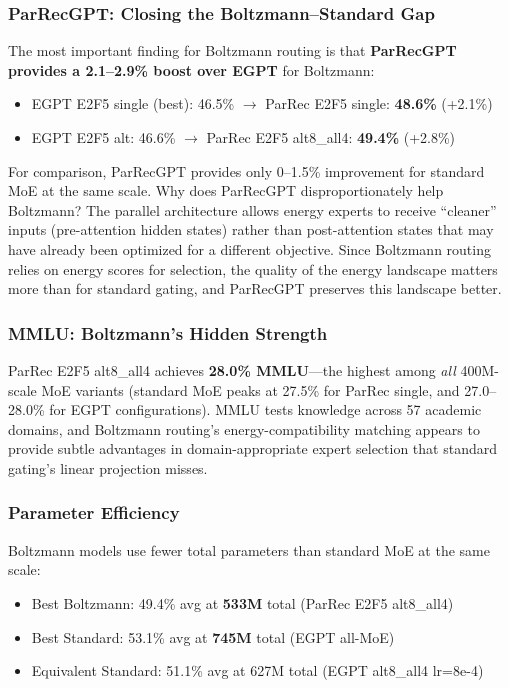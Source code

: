 \documentclass[oneside]{article}
\begin{document}
\subsubsection{ParRecGPT: Closing the Boltzmann--Standard Gap}

The most important finding for Boltzmann routing is that \textbf{ParRecGPT provides a 2.1--2.9\% boost over EGPT} for Boltzmann:
\begin{itemize}
    \item EGPT E2F5 single (best): 46.5\% $\to$ ParRec E2F5 single: \textbf{48.6\%} (+2.1\%)
    \item EGPT E2F5 alt: 46.6\% $\to$ ParRec E2F5 alt8\_all4: \textbf{49.4\%} (+2.8\%)
\end{itemize}

For comparison, ParRecGPT provides only 0--1.5\% improvement for standard MoE at the same scale. Why does ParRecGPT disproportionately help Boltzmann? The parallel architecture allows energy experts to receive ``cleaner'' inputs (pre-attention hidden states) rather than post-attention states that may have already been optimized for a different objective. Since Boltzmann routing relies on energy scores for selection, the quality of the energy landscape matters more than for standard gating, and ParRecGPT preserves this landscape better.

\subsubsection{MMLU: Boltzmann's Hidden Strength}

ParRec E2F5 alt8\_all4 achieves \textbf{28.0\% MMLU}---the highest among \textit{all} 400M-scale MoE variants (standard MoE peaks at 27.5\% for ParRec single, and 27.0--28.0\% for EGPT configurations). MMLU tests knowledge across 57 academic domains, and Boltzmann routing's energy-compatibility matching appears to provide subtle advantages in domain-appropriate expert selection that standard gating's linear projection misses.

\subsubsection{Parameter Efficiency}

Boltzmann models use fewer total parameters than standard MoE at the same scale:
\begin{itemize}
    \item Best Boltzmann: 49.4\% avg at \textbf{533M} total (ParRec E2F5 alt8\_all4)
    \item Best Standard: 53.1\% avg at \textbf{745M} total (EGPT all-MoE)
    \item Equivalent Standard: 51.1\% avg at 627M total (EGPT alt8\_all4 lr=8e-4)
\end{itemize}
\end{document}

